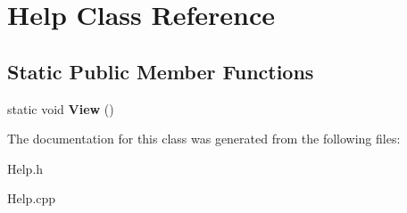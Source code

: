 \hypertarget{class_help}{}\section{Help Class Reference}
\label{class_help}
\subsection*{Static Public Member Functions}
\begin{DoxyCompactItemize}
\item 
\hypertarget{class_help_ac985b795e504eec0e66a2d64ea380f33}{}static void {\bfseries View} ()\label{class_help_ac985b795e504eec0e66a2d64ea380f33}

\end{DoxyCompactItemize}


The documentation for this class was generated from the following files\+:\begin{DoxyCompactItemize}
\item 
Help.\+h\item 
Help.\+cpp\end{DoxyCompactItemize}
